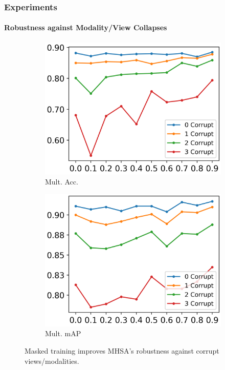 \begin{frame}
\frametitle{Experiments}
\framesubtitle{Robustness against Modality/View Collapses}

\begin{figure}[tb]
\centering
\begin{subfigure}{0.49\linewidth}
    \centering
    \includegraphics[width=\textwidth]{images/cls_acc.png}
    \caption{Mult. Acc.}
    \label{fig:robust_cls_acc}
\end{subfigure}
\hfill
\begin{subfigure}{0.49\linewidth}
    \centering
    \includegraphics[width=\textwidth]{images/cls_pr.png}
    \caption{Mult. mAP}
    \label{fig:robust_cls_pr}
\end{subfigure}
\hfill
\caption{Masked training improves MHSA's robustness against corrupt views/modalities.}
\label{fig:9}
\end{figure}
\end{frame}
